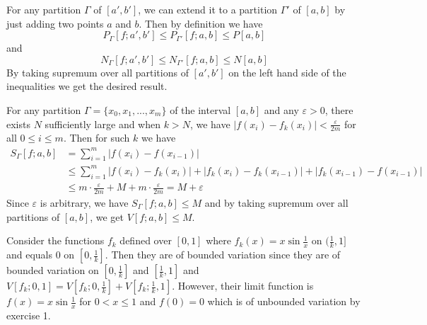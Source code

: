 \begin{exercise}{2.3}
  For any partition $\Gamma$ of $[a',b']$,
  we can extend it to a partition $\Gamma'$ of $[a,b]$ by just adding two points $a$ and $b$.
  Then by definition we have
  \[
    P_{\Gamma}[f;a',b']\leq P_{\Gamma'}[f;a,b]\leq P[a,b]
  \]
  and
  \[
    N_{\Gamma}[f;a',b']\leq N_{\Gamma'}[f;a,b]\leq N[a,b]
  \]
  By taking supremum over all partitions of $[a',b']$ on the left hand side of the inequalities
  we get the desired result.
\end{exercise}

\begin{exercise}{2.4}
  For any partition $\Gamma=\{x_0,x_1,...,x_m\}$ of the interval $[a,b]$
  and any $\varepsilon>0$,
  there exists $N$ sufficiently large and when $k>N$,
  we have $|f(x_i)-f_k(x_i)|<\frac{\varepsilon}{2m}$
  for all $0\leq i\leq m.$
  Then for such $k$ we have
  \begin{align*}
    S_{\Gamma}[f;a,b]&=\sum_{i=1}^m|f(x_i)-f(x_{i-1})|\\
    &\leq \sum_{i=1}^m|f(x_i)-f_k(x_i)|+|f_k(x_i)-f_k(x_{i-1})|+|f_k(x_{i-1})-f(x_{i-1})|\\
    &\leq m\cdot \frac{\varepsilon}{2m}+M+m\cdot \frac{\varepsilon}{2m}=M+\varepsilon
  \end{align*}
  Since $\varepsilon$ is arbitrary,
  we have $S_{\Gamma}[f;a,b]\leq M$ and by taking supremum over all partitions of $[a,b]$,
  we get $V[f;a,b]\leq M.$

  Consider the functions $f_k$ defined over $[0,1]$
  where $f_k(x)=x\sin{\frac{1}{x}}$ on $(\frac{1}{k},1]$
  and equals 0 on $[0,\frac{1}{k}].$
  Then they are of bounded variation
  since they are of bounded variation on $[0,\frac{1}{k}]$ and $[\frac{1}{k},1]$
  and $V[f_k;0,1]=V[f_k;0,\frac{1}{k}]+V[f_k;\frac{1}{k},1].$
  However, their limit function is $f(x)=x\sin{\frac{1}{x}}$ for $0<x\leq 1$ and $f(0)=0$
  which is of unbounded variation by exercise 1.
\end{exercise}

